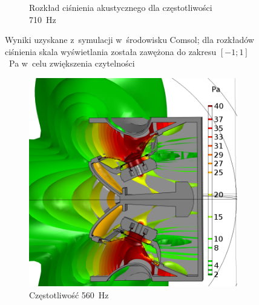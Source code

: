 \documentclass[12pt]{oska}
\begin{document}
\begin{figure}[!ht]
\begin{subfigure}[b]{.49\textwidth}
				\caption{Rozkład ciśnienia akustycznego dla częstotliwości \SI{710}{\hertz}}
				\label{r:C_710}
			\end{subfigure}
			\caption{Wyniki uzyskane z~symulacji w~środowisku Comsol; dla rozkładów ciśnienia skala wyświetlania została zawężona do zakresu $[-1;1]$~\si{\pascal} w~celu zwiększenia czytelności}
			\label{r:C_rozklady}
		\end{figure}
		
		\begin{figure}[!ht]
			\centering
			\begin{subfigure}[b]{.49\textwidth}
				\includegraphics[width=\textwidth]{absp_560Hz.png}
				\caption{Częstotliwość \SI{560}{\hertz}}
				\label{r:C_560iz}
			\end{subfigure}
			~
			\begin{subfigure}[b]{.49\textwidth}

\end{subfigure}
\end{figure}
\end{document}
